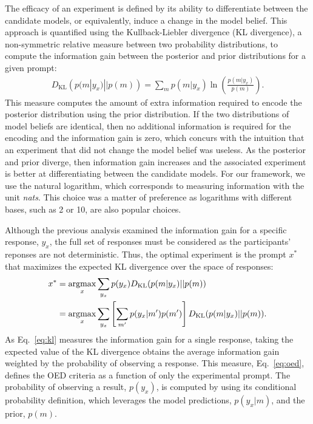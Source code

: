 \documentclass[11pt]{article}
\newcommand{\argmax}{\operatornamewithlimits{argmax}}
\begin{document}
The efficacy of an experiment is defined by its ability to differentiate between the candidate models, or equivalently, induce a change in the model belief. This approach is quantified using the Kullback-Liebler divergence (KL divergence), a non-symmetric relative measure between two probability distributions, to compute the information gain between the posterior and prior distributions for a given prompt:
\begin{align}
D_{\text{KL}}\left(p(m|y_x) || p(m)\right) = \sum\limits_m p(m|y_x) \ln \left( \frac{p(m|y_x)}{p(m)}\right). \label{eq:kl}
\end{align}
This measure computes the amount of extra information required to encode the posterior distribution using the prior distribution. If the two distributions of model beliefs are identical, then no additional information is required for the encoding and the information gain is zero, which concurs with the intuition that an experiment that did not change the model belief was useless. As the posterior and prior diverge, then information gain increases and the associated experiment is better at differentiating between the candidate models. For our framework, we use the natural logarithm, which corresponds to measuring information with the unit \emph{nats}. This choice was a matter of preference as logarithms with different bases, such as 2 or 10, are also popular choices. 

Although the previous analysis examined the information gain for a specific response, $y_x$, the full set of responses must be considered as the participants' reponses are not deterministic. Thus, the optimal experiment is the prompt $x^*$ that maximizes the expected KL divergence over the space of responses:
\begin{align}
x^* &= \argmax_{x} \sum\limits_{y_x} p(y_x) D_{\text{KL}}(p(m|y_x) || p(m)) \notag \\
    &= \argmax_{x} \sum\limits_{y_x} \left[\sum\limits_{m'} p(y_x|m')p(m')\right] D_{\text{KL}}(p(m|y_x) || p(m)). \label{eq:oed}
\end{align}
As Eq.~\ref{eq:kl} measures the information gain for a single response, taking the expected value of the KL divergence obtains the average information gain weighted by the probability of observing a response. This measure, Eq.~\ref{eq:oed}, defines the OED criteria as a function of only the experimental prompt. The probability of observing a result, $p(y_x)$, is computed by using its conditional probability definition, which leverages the model predictions, $p(y_x|m)$, and the prior, $p(m)$.
\end{document}
